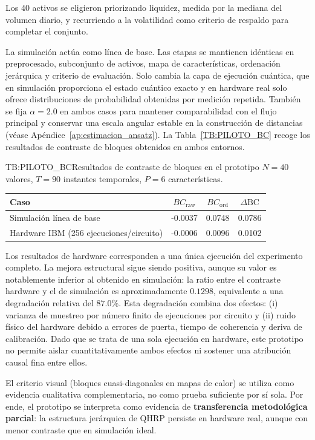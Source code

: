 Los 40 activos se eligieron priorizando liquidez, medida por la mediana del volumen diario, y recurriendo a la volatilidad como criterio de respaldo para completar el conjunto.

La simulación actúa como línea de base. Las etapas se mantienen idénticas en preprocesado, subconjunto de activos, mapa de características, ordenación jerárquica y criterio de evaluación. Solo cambia la capa de ejecución cuántica, que en simulación proporciona el estado cuántico exacto y en hardware real solo ofrece distribuciones de probabilidad obtenidas por medición repetida. También se fija \(\alpha=2.0\) en ambos casos para mantener comparabilidad con el flujo principal y conservar una escala angular estable en la construcción de distancias (véase Apéndice~\ref{ap:estimacion_ansatz}). La Tabla~\ref{TB:PILOTO_BC} recoge los resultados de contraste de bloques obtenidos en ambos entornos.

\begin{table}[Prototipo hardware vs simulación]{TB:PILOTO_BC}{Resultados de contraste de bloques en el prototipo \(N=40\) valores, \(T=90\) instantes temporales, \(P=6\) características.}
\begin{tabular}{lccc}
\hline
\textbf{Caso} & \textbf{$BC_{\mathrm{raw}}$} & \textbf{$BC_{\mathrm{ord}}$} & \textbf{$\Delta\mathrm{BC}$} \\
\hline
Simulación línea de base & -0.0037 & 0.0748 & 0.0786 \\
Hardware IBM (256 ejecuciones/circuito) & -0.0006 & 0.0096 & 0.0102 \\
\hline
\end{tabular}
\end{table}

Los resultados de hardware corresponden a una única ejecución del experimento completo. La mejora estructural sigue siendo positiva, aunque su valor es notablemente inferior al obtenido en simulación: la ratio entre el contraste hardware y el de simulación es aproximadamente $0.1298$, equivalente a una degradación relativa del $87.0\%$. Esta degradación combina dos efectos: (i) varianza de muestreo por número finito de ejecuciones por circuito y (ii) ruido físico del hardware debido a errores de puerta, tiempo de coherencia y deriva de calibración. Dado que se trata de una sola ejecución en hardware, este prototipo no permite aislar cuantitativamente ambos efectos ni sostener una atribución causal fina entre ellos.

El criterio visual (bloques cuasi-diagonales en mapas de calor) se utiliza como evidencia cualitativa complementaria, no como prueba suficiente por sí sola. Por ende, el prototipo se interpreta como evidencia de \textbf{transferencia metodológica parcial}: la estructura jerárquica de QHRP persiste en hardware real, aunque con menor contraste que en simulación ideal.


